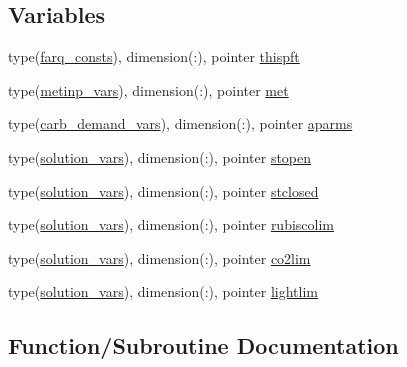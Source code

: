 \subsection*{Variables}
\begin{DoxyCompactItemize}
\item 
type(\hyperlink{structc34constants_1_1farq__consts}{farq\+\_\+consts}), dimension(\+:), pointer \hyperlink{namespacec34constants_a4a1314df0becf145f8a2365aa27d992d}{thispft}
\item 
type(\hyperlink{structc34constants_1_1metinp__vars}{metinp\+\_\+vars}), dimension(\+:), pointer \hyperlink{namespacec34constants_a6d1c98b7c360f24d485be8fc38bdd284}{met}
\item 
type(\hyperlink{structc34constants_1_1carb__demand__vars}{carb\+\_\+demand\+\_\+vars}), dimension(\+:), pointer \hyperlink{namespacec34constants_a844bf4288f019d9dcee7612f54d1e50c}{aparms}
\item 
type(\hyperlink{structc34constants_1_1solution__vars}{solution\+\_\+vars}), dimension(\+:), pointer \hyperlink{namespacec34constants_a5affd928720d3a40f01f1198b68b7fb3}{stopen}
\item 
type(\hyperlink{structc34constants_1_1solution__vars}{solution\+\_\+vars}), dimension(\+:), pointer \hyperlink{namespacec34constants_a083891d928147a7252ada72b49b240a3}{stclosed}
\item 
type(\hyperlink{structc34constants_1_1solution__vars}{solution\+\_\+vars}), dimension(\+:), pointer \hyperlink{namespacec34constants_a54cb2e4894b639d22e50b457b4208cfc}{rubiscolim}
\item 
type(\hyperlink{structc34constants_1_1solution__vars}{solution\+\_\+vars}), dimension(\+:), pointer \hyperlink{namespacec34constants_abed7f7ff7745473ac53005a45206f506}{co2lim}
\item 
type(\hyperlink{structc34constants_1_1solution__vars}{solution\+\_\+vars}), dimension(\+:), pointer \hyperlink{namespacec34constants_af66eea644957075da5a5285e735e143b}{lightlim}
\end{DoxyCompactItemize}


\subsection{Function/\+Subroutine Documentation}
